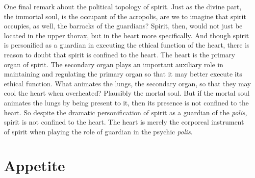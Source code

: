 One final remark about the political topology of spirit. Just as the divine part, the immortal soul, is the occupant of the acropolis, are we to imagine that spirit occupies, as well, the barracks of the guardians? Spirit, then, would not just be located in the upper thorax, but in the heart more specifically. And though spirit is personified as a guardian in executing the ethical function of the heart, there is reason to doubt that spirit is confined to the heart. The heart is the primary organ of spirit. The secondary organ plays an important auxiliary role in maintaining and regulating the primary organ so that it may better execute its ethical function. What animates the lungs, the secondary organ, so that they may cool the heart when overheated? Plausibly the mortal soul. But if the mortal soul animates the lungs by being present to it, then its presence is not confined to the heart. So despite the dramatic personification of spirit as a guardian of the \emph{polis}, spirit is not confined to the heart. The heart is merely the corporeal instrument of spirit when playing the role of guardian in the psychic \emph{polis}.


\section{Appetite} %
\label{sec:appetite}

